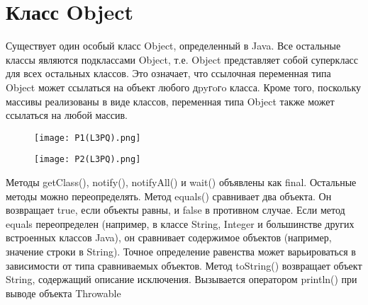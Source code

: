 

\section{Класс Object}
Существует один особый класс Object, определенный в Java. Все остальные классы являются подклассами Object, т.е. Object представляет собой суперкласс для всех остальных классов. Это означает, что ссылочная переменная типа Object может ссылаться на объект любого дpyгoгo класса. Кроме того, поскольку массивы реализованы в виде классов, переменная типа Object также может ссылаться на любой массив.
\begin{figure}[H]
    \centering
    \texttt{[image: P1(L3PQ).png]}
\end{figure}
\begin{figure}[H]
    \centering
    \texttt{[image: P2(L3PQ).png]}
\end{figure} 
\noindent Методы getClass(), notify(), notifyAll() и wait() объявлены как final. Остальные методы можно переопределять. Метод equals() сравнивает два объекта. Он возвращает true, если объекты равны, и false в противном случае. Если метод equals переопределен (например, в классе String, Integer и большинстве других встроенных классов Java), он сравнивает содержимое объектов (например, значение строки в String). Точное определение равенства может варьироваться в зависимости от типа сравниваемых объектов. Метод toString() возвращает объект String, содержащий описание исключения. Вызывается оператором println() при выводе объекта Throwable 
